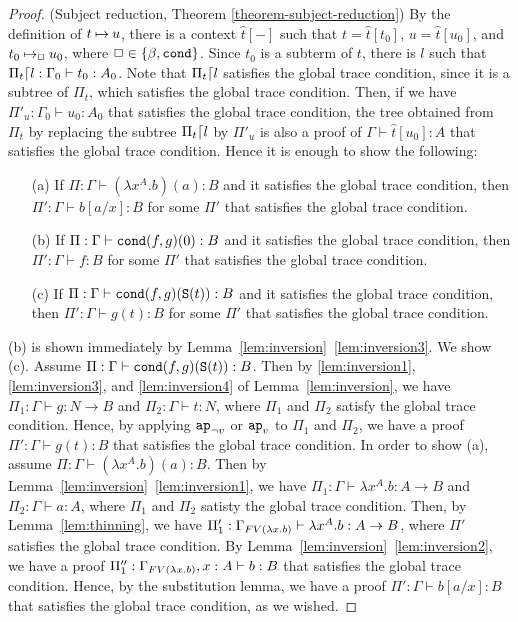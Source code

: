 \begin{proof}(Subject reduction, Theorem \ref{theorem-subject-reduction})
  By the definition of $t\mathbin{\mapsto} u$, there is a context $\hat{t}[-]$ such that
  $t=\hat{t}[t_0]$, $u=\hat{t}[u_0]$, and $t_0\mathbin{\mapsto}_\Box u_0$, where $\Box\in\{\beta,{\tt cond}\}$. 
  Since $t_0$ is a subterm of $t$, there is $l$ such that $\Pi_t{\lceil} l: \Gamma_0\vdash t_0:A_0$.
  Note that $\Pi_t{\lceil} l$ satisfies the global trace condition,
  since it is a subtree of $\Pi_t$, which satisfies the global trace condition. 
  Then, if we have $\Pi'_u:\Gamma_0\vdash u_0:A_0$ that satisfies the global trace condition,
  the tree obtained from $\Pi_t$ by replacing the subtree $\Pi_t{\lceil} l$ by $\Pi'_u$ is also
  a proof of $\Gamma\vdash \hat{t}[u_0]:A$ that satisfies the global trace condition. 
  Hence it is enough to show the following:
  \begin{itemize}
  \item[(a)]
    If $\Pi:\Gamma \vdash (\lambda x^A.b)(a): B$ and it satisfies the global trace condition,
    then $\Pi':\Gamma \vdash b[a/x]: B$ for some $\Pi'$ that satisfies the global trace condition.
  \item[(b)]
    If $\Pi:\Gamma \vdash {\tt cond}(f,g)(0): B$ and it satisfies the global trace condition,
    then $\Pi':\Gamma \vdash f: B$ for some $\Pi'$ that satisfies the global trace condition. 
  \item[(c)]
    If $\Pi:\Gamma \vdash {\tt cond}(f,g)({\tt S}(t)): B$ and it satisfies the global trace condition,
    then $\Pi':\Gamma \vdash g(t): B$ for some $\Pi'$ that satisfies the global trace condition. 
  \end{itemize}
  (b) is shown immediately by Lemma~\ref{lem:inversion}~\ref{lem:inversion3}.
  We show (c).
  Assume $\Pi:\Gamma \vdash {\tt cond}(f,g)({\tt S}(t)): B$.
  Then by \ref{lem:inversion1}, \ref{lem:inversion3}, and \ref{lem:inversion4} of Lemma~\ref{lem:inversion},
  we have
  $\Pi_1:\Gamma \vdash g:N\to B$ and $\Pi_2:\Gamma \vdash t:N$,
  where $\Pi_1$ and $\Pi_2$ satisfy the global trace condition. 
  Hence, by applying $\apnotvar$ or $\apvar$ to $\Pi_1$ and $\Pi_2$, 
  we have a proof $\Pi':\Gamma\vdash g(t):B$ that satisfies the global trace condition. 
  In order to show (a), assume $\Pi:\Gamma \vdash (\lambda x^A.b)(a): B$.
  Then by Lemma~\ref{lem:inversion}~\ref{lem:inversion1},
  we have $\Pi_1:\Gamma \vdash \lambda x^A.b:A\to B$ and $\Pi_2:\Gamma \vdash a:A$,
  where $\Pi_1$ and $\Pi_2$ satisty the global trace condition. 
  Then, by Lemma~\ref{lem:thinning},
  we have $\Pi'_1:\Gamma_{{{\relax FV}}(\lambda x.b)} \vdash \lambda x^A.b:A\to B$,
  where $\Pi'$ satisfies the global trace condition. 
  By Lemma~\ref{lem:inversion}~\ref{lem:inversion2},
  we have a proof $\Pi''_1:\Gamma_{{{\relax FV}}(\lambda x.b)},x:A \vdash b:B$
  that satisfies the global trace condition. 
  Hence, by the substitution lemma, we have a proof $\Pi':\Gamma\vdash b[a/x]:B$
  that satisfies the global trace condition, as we wished. 
\end{proof}

